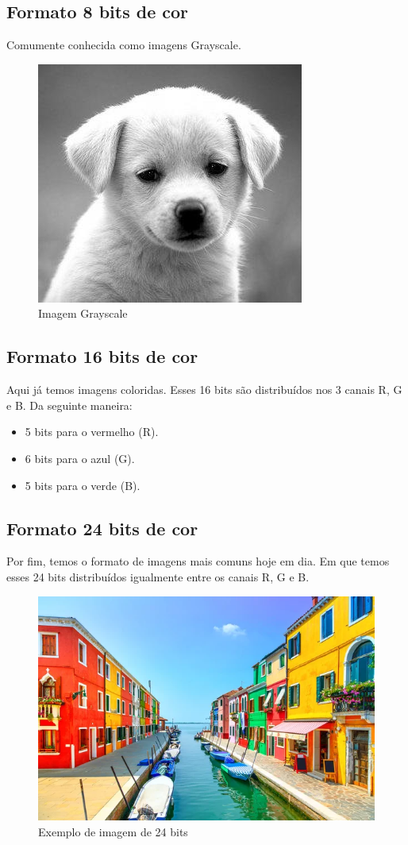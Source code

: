 \documentclass[a4paper, 12pt]{article}
\begin{document}
\subsection{Formato 8 bits de cor}
Comumente conhecida como imagens Grayscale.
\begin{figure}[!htbp]
	\centering
	\includegraphics[scale=0.5]{images/grayscale.jpg}
	\caption{Imagem Grayscale}
\end{figure}

\subsection{Formato 16 bits de cor}
Aqui já temos imagens coloridas. Esses 16 bits são distribuídos nos 3 canais R, G e B. Da seguinte maneira:
\begin{itemize}
	\item 5 bits para o vermelho (R).
 \item 6 bits para o azul (G).
 \item 5 bits para o verde (B).
\end{itemize}

\subsection{Formato 24 bits de cor}
Por fim, temos o formato de imagens mais comuns hoje em dia. Em que temos esses 24 bits distribuídos igualmente entre os canais R, G e B.
\begin{figure}[!htbp]
	\centering
	\includegraphics[scale=0.4]{images/colorida.png}
	\caption{Exemplo de imagem de 24 bits}
\end{figure}
\end{document}
